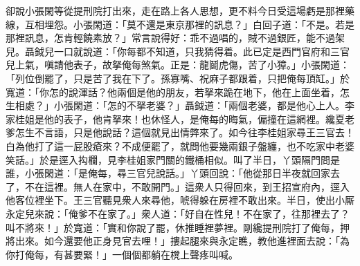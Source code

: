卻說小張閑等從提刑院打出來，走在路上各人思想，更不料今日受這場虧是那裡藥線，互相埋怨。小張閑道：「莫不還是東京那裡的訊息？」白回子道：「不是。若是那裡訊息，怎肯輕饒素放？」常言說得好：乖不過唱的，賊不過銀匠，能不過架兒。{}聶鉞兒一口就說道：「你每都不知道，只我猜得着。此已定是西門官府和三官兒上氣，嗔請他表子，故拏俺每煞氣。正是：龍鬬虎傷，苦了小獐。」小張閑道：「列位倒罷了，只是苦了我在下了。孫寡嘴、祝麻子都跟着，只把俺每頂缸。」於寬道：「你怎的說渾話？他兩個是他的朋友，若拏來跪在地下，他在上面坐着，怎生相處？」小張閑道：「怎的不拏老婆？」聶鉞道：「兩個老婆，都是他心上人。李家桂姐是他的表子，他肯拏來！也休怪人，是俺每的晦氣，偏撞在這網裡。纔夏老爹怎生不言語，只是他說話？這個就見出情弊來了。如今往李桂姐家尋王三官去！白為他打了這一屁股瘡來？不成便罷了，就問他要幾兩銀子盤纏，也不吃家中老婆笑話。」於是逕入抅欄，見李桂姐家門關的鐵桶相似。叫了半日，丫頭隔門問是誰，小張閑道：「是俺每，尋三官兒說話。」丫頭回說：「他從那日半夜就回家去了，不在這裡。無人在家中，不敢開門。」這衆人只得回來，到王招宣府內，逕入他客位裡坐下。王三官聽見衆人來尋他，唬得躲在房裡不敢出來。半日，使出小厮永定兒來說：「俺爹不在家了。」衆人道：「好自在性兒！不在家了，往那裡去了？叫不將來！」於寬道：「實和你說了罷，休推睡裡夢裡。剛纔提刑院打了俺每，押將出來。如今還要他正身見官去哩！」摟起腿來與永定瞧，教他進裡面去說：「為你打俺每，有甚要緊！」一個個都躺在櫈上聲疼叫喊。

